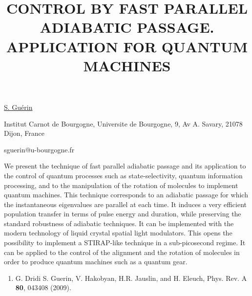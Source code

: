 \title{CONTROL BY FAST PARALLEL ADIABATIC PASSAGE. APPLICATION FOR QUANTUM MACHINES}

\underline{S. Gu\'erin} 

{\normalsize{\vspace{-4mm}
Institut Carnot de Bourgogne, Universite de Bourgogne, 9, Av A.
Savary, 21078 Dijon, France

\email sguerin@u-bourgogne.fr}}

We present the technique of fast parallel adiabatic passage and its application to the control of quantum processes such as state-selectivity, quantum information processing, and to the manipulation of the rotation of molecules to implement quantum machines.
This technique corresponds to an adiabatic passage for which the instantaneous eigenvalues are parallel at each time. It induces a very efficient population transfer in terms of pulse energy and duration, while preserving the standard robustness of adiabatic techniques.
It can be implemented with the modern technology of liquid crystal spatial light modulators.
This opens the possibility to implement a STIRAP-like technique in a sub-picosecond regime.
It can be applied to the control of the alignment and the rotation of molecules in order to produce quantum machines such as a quantum gear.

\begin{enumerate}
\item G. Dridi S. Guerin, V. Hakobyan, H.R. Jauslin, and H. Eleuch, Phys. Rev. A \textbf{80}, 043408 (2009).
\end{enumerate}

\vspace{\baselineskip} 